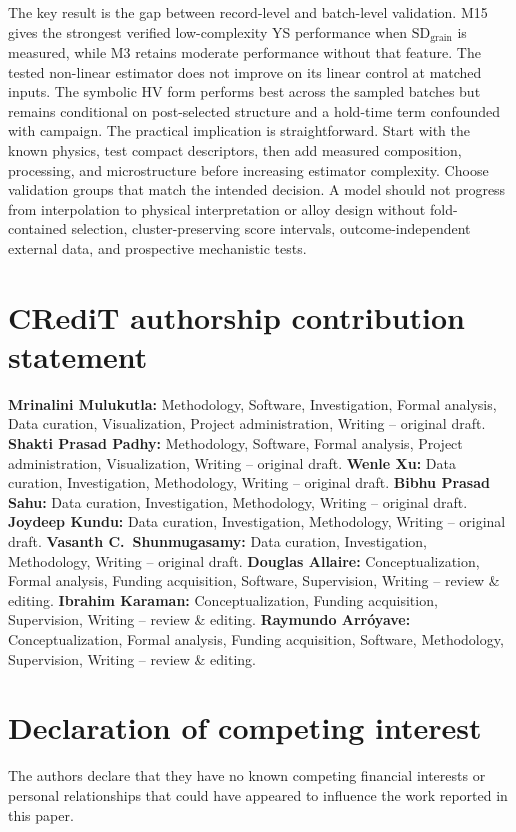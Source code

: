 \documentclass[5p,times,twocolumn]{elsarticle}
\begin{document}
The key result is the gap between record-level and batch-level validation. M15 gives the strongest verified low-complexity YS performance when $\mathrm{SD}_{\mathrm{grain}}$ is measured, while M3 retains moderate performance without that feature. The tested non-linear estimator does not improve on its linear control at matched inputs. The symbolic HV form performs best across the sampled batches but remains conditional on post-selected structure and a hold-time term confounded with campaign. The practical implication is straightforward. Start with the known physics, test compact descriptors, then add measured composition, processing, and microstructure before increasing estimator complexity. Choose validation groups that match the intended decision. A model should not progress from interpolation to physical interpretation or alloy design without fold-contained selection, cluster-preserving score intervals, outcome-independent external data, and prospective mechanistic tests.

\section*{CRediT authorship contribution statement}
\textbf{Mrinalini Mulukutla:} Methodology, Software, Investigation, Formal analysis, Data curation, Visualization, Project administration, Writing -- original draft.
\textbf{Shakti Prasad Padhy:} Methodology, Software, Formal analysis, Project administration, Visualization, Writing -- original draft.
\textbf{Wenle Xu:} Data curation, Investigation, Methodology, Writing -- original draft.
\textbf{Bibhu Prasad Sahu:} Data curation, Investigation, Methodology, Writing -- original draft.
\textbf{Joydeep Kundu:} Data curation, Investigation, Methodology, Writing -- original draft.
\textbf{Vasanth C.\ Shunmugasamy:} Data curation, Investigation, Methodology, Writing -- original draft.
\textbf{Douglas Allaire:} Conceptualization, Formal analysis, Funding acquisition, Software, Supervision, Writing -- review \& editing.
\textbf{Ibrahim Karaman:} Conceptualization, Funding acquisition, Supervision, Writing -- review \& editing.
\textbf{Raymundo Arr\'{o}yave:} Conceptualization, Formal analysis, Funding acquisition, Software, Methodology, Supervision, Writing -- review \& editing.

\section*{Declaration of competing interest}
The authors declare that they have no known competing financial interests or personal relationships that could have appeared to influence the work reported in this paper.
\end{document}

